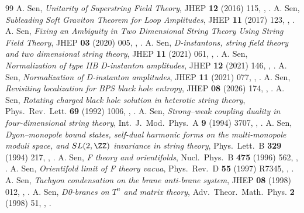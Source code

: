 \begin{thebibliography}{99}
 A. Sen, \emph{Unitarity of Superstring Field Theory}, JHEP \textbf{12} (2016) 115, , .
 A. Sen, \emph{Subleading Soft Graviton Theorem for Loop Amplitudes}, JHEP \textbf{11} (2017) 123, , .
 A. Sen, \emph{Fixing an Ambiguity in Two Dimensional String Theory Using String Field Theory}, JHEP \textbf{03} (2020) 005, , .
 A. Sen, \emph{D-instantons, string field theory and two dimensional string theory}, JHEP \textbf{11} (2021) 061, , .
 A. Sen, \emph{Normalization of type IIB D-instanton amplitudes}, JHEP \textbf{12} (2021) 146, , .
 A. Sen, \emph{Normalization of D-instanton amplitudes}, JHEP \textbf{11} (2021) 077, , .
 A. Sen, \emph{Revisiting localization for BPS black hole entropy}, JHEP \textbf{08} (2026) 174, , .
 A. Sen, \emph{Rotating charged black hole solution in heterotic string theory}, Phys.\ Rev.\ Lett. \textbf{69} (1992) 1006, , .
 A. Sen, \emph{Strong--weak coupling duality in four-dimensional string theory}, Int.\ J.\ Mod.\ Phys.\ A \textbf{9} (1994) 3707, , .
 A. Sen, \emph{Dyon--monopole bound states, self-dual harmonic forms on the multi-monopole moduli space, and $SL(2,\ZZ)$ invariance in string theory}, Phys.\ Lett.\ B \textbf{329} (1994) 217, , .
 A. Sen, \emph{F theory and orientifolds}, Nucl.\ Phys.\ B \textbf{475} (1996) 562, , .
 A. Sen, \emph{Orientifold limit of F theory vacua}, Phys.\ Rev.\ D \textbf{55} (1997) R7345, , .
 A. Sen, \emph{Tachyon condensation on the brane anti-brane system}, JHEP \textbf{08} (1998) 012, , .
 A. Sen, \emph{D0-branes on $T^n$ and matrix theory}, Adv.\ Theor.\ Math.\ Phys. \textbf{2} (1998) 51, , .

\end{thebibliography}
